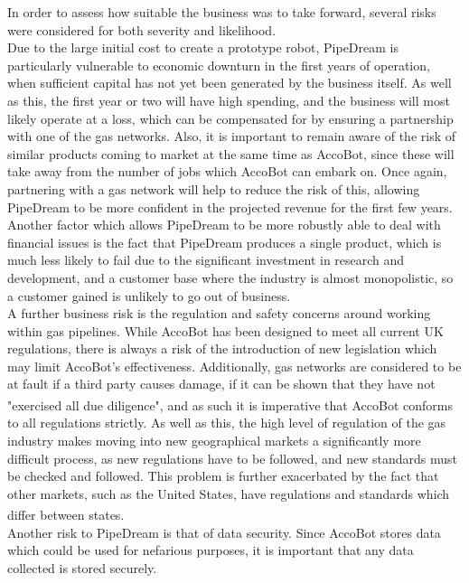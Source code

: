 \documentclass[11pt]{article}		%
\newcommand{\supercite}[1]{\textsuperscript{\cite{#1}}}		%
\begin{document}
     	In order to assess how suitable the business was to take forward, several risks were considered for both severity and likelihood.
     	\\
     	Due to the large initial cost to create a prototype robot, PipeDream is particularly vulnerable to economic downturn in the first years of operation, when sufficient capital has not yet been generated by the business itself.
     	As well as this, the first year or two will have high spending, and the business will most likely operate at a loss, which can be compensated for by ensuring a partnership with one of the gas networks.
     	Also, it is important to remain aware of the risk of similar products coming to market at the same time as AccoBot, since these will take away from the number of jobs which AccoBot can embark on.
     	Once again, partnering with a gas network will help to reduce the risk of this, allowing PipeDream to be more confident in the projected revenue for the first few years.
     	Another factor which allows PipeDream to be more robustly able to deal with financial issues is the fact that PipeDream produces a single product, which is much less likely to fail due to the significant investment in research and development, and a customer base where the industry is almost monopolistic, so a customer gained is unlikely to go out of business.
     	\\
     	A further business risk is the regulation and safety concerns around working within gas pipelines.
     	While AccoBot has been designed to meet all current UK regulations, there  is always a risk of the introduction of new legislation which may limit AccoBot's effectiveness.
     	Additionally, gas networks are considered to be at fault if a third party causes damage, if it can be shown that they have not "exercised all due diligence"\supercite{hse1996guide}, and as such it is imperative that AccoBot conforms to all regulations strictly.
     	As well as this, the high level of regulation of the gas industry makes moving into new geographical markets a significantly more difficult process, as new regulations have to be followed, and new standards must be checked and followed.
     	This problem is further exacerbated by the fact that other markets, such as the United States, have regulations and standards which differ between states\supercite{pless2011making}.
     	\\
     	Another risk to PipeDream is that of data security.
     	Since AccoBot stores data which could be used for nefarious purposes, it is important that any data collected is stored securely.
\end{document}
